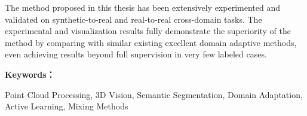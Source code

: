 The method proposed in this thesis has been extensively experimented and validated on synthetic-to-real and real-to-real cross-domain tasks. The experimental and visualization results fully demonstrate the superiority of the method by comparing with similar existing excellent domain adaptive methods, even achieving results beyond full supervision in very few labeled cases.

\noindent\textbf{Keywords：} 
\begin{minipage}[t]{0.85\linewidth}
	Point Cloud Processing, 3D Vision, Semantic Segmentation,  Domain Adaptation, Active Learning, Mixing Methods
\end{minipage}

\clearpage